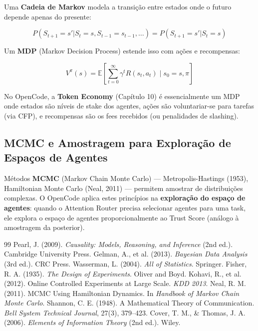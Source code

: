 Uma \textbf{Cadeia de Markov} modela a transição entre estados onde o futuro depende apenas do presente:

\begin{equation}
P(S_{t+1} = s' | S_t = s, S_{t-1} = s_{t-1}, \ldots) = P(S_{t+1} = s' | S_t = s)
\label{eq:markov}
\end{equation}

Um \textbf{MDP} (Markov Decision Process) estende isso com ações e recompensas:

\begin{equation}
V^\pi(s) = \mathbb{E}\left[\sum_{t=0}^{\infty} \gamma^t R(s_t, a_t) \mid s_0 = s, \pi\right]
\label{eq:mdp}
\end{equation}

No OpenCode, a \textbf{Token Economy} (Capítulo 10) é essencialmente um MDP onde estados são níveis de stake dos agentes, ações são voluntariar-se para tarefas (via CFP), e recompensas são os fees recebidos (ou penalidades de slashing).

\subsection{MCMC e Amostragem para Exploração de Espaços de Agentes}

Métodos \textbf{MCMC} (Markov Chain Monte Carlo) — Metropolis-Hastings (1953), Hamiltonian Monte Carlo (Neal, 2011) — permitem amostrar de distribuições complexas. O OpenCode aplica estes princípios na \textbf{exploração do espaço de agentes}: quando o Attention Router precisa selecionar agentes para uma task, ele explora o espaço de agentes proporcionalmente ao Trust Score (análogo à amostragem da posterior).

\begin{thebibliography}{99}
 Pearl, J. (2009). \textit{Causality: Models, Reasoning, and Inference} (2nd ed.). Cambridge University Press. 
 Gelman, A., et al. (2013). \textit{Bayesian Data Analysis} (3rd ed.). CRC Press.
 Wasserman, L. (2004). \textit{All of Statistics}. Springer. 
 Fisher, R. A. (1935). \textit{The Design of Experiments}. Oliver and Boyd.
 Kohavi, R., et al. (2012). Online Controlled Experiments at Large Scale. \textit{KDD 2013}. 
 Neal, R. M. (2011). MCMC Using Hamiltonian Dynamics. In \textit{Handbook of Markov Chain Monte Carlo}. 
 Shannon, C. E. (1948). A Mathematical Theory of Communication. \textit{Bell System Technical Journal}, 27(3), 379--423. 
 Cover, T. M., \& Thomas, J. A. (2006). \textit{Elements of Information Theory} (2nd ed.). Wiley. 
\end{thebibliography}
